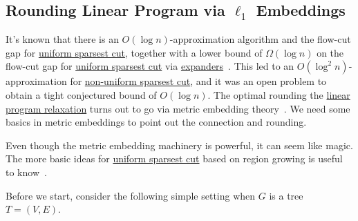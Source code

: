 \subsection{Rounding Linear Program via \(\ell _1\) Embeddings}
It's known that there is an \(O(\log n)\)-approximation algorithm and the flow-cut gap for \hyperref[prb:sparsest-cut]{uniform sparsest cut}, together with a lower bound of \(\Omega (\log n)\) on the flow-cut gap for \hyperref[prb:sparsest-cut]{uniform sparsest cut} via \hyperref[def:expander]{expanders}~\cite{leighton1999multicommodity}. This led to an \(O(\log ^2 n)\)-approximation for \hyperref[prb:non-uniform-sparsest-cut]{non-uniform sparsest cut}, and it was an open problem to obtain a tight conjectured bound of \(O(\log n)\). The optimal rounding the \hyperref[eq:non-uniform-sparsest-cut-LP-primal]{linear program relaxation} turns out to go via metric embedding theory~\cite{linial1995geometry,aumann1998log}. We need some basics in metric embeddings to point out the connection and rounding.

\begin{note}
	Even though the metric embedding machinery is powerful, it can seem like magic. The more basic ideas for \hyperref[prb:sparsest-cut]{uniform sparsest cut} based on region growing is useful to know~\cite{williamson2011design}.
\end{note}

Before we start, consider the following simple setting when \(G\) is a tree \(T = (V, E)\).

